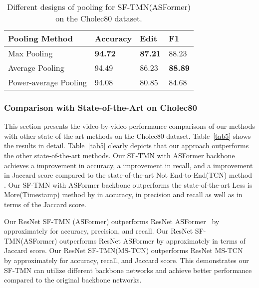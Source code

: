 \documentclass[sn-mathphys,Numbered]{sn-jnl}
\theoremstyle{thmstyleone}\newtheorem{theorem}{Theorem}\newtheorem{proposition}[theorem]{Proposition}
\theoremstyle{thmstyletwo}\newtheorem{example}{Example}\newtheorem{remark}{Remark}
\theoremstyle{thmstylethree}\newtheorem{definition}{Definition}
\begin{document}
\begin{table}[h]
\centering
\caption{Different designs of pooling for SF-TMN(ASFormer) on the Cholec80 dataset.}\label{tab3r}
\begin{tabular}{llll}
\hline
Pooling Method & Accuracy & Edit & F1\\
\hline
Max Pooling &  \textbf{94.72} & \textbf{87.21} &  88.23 \\
Average Pooling &  94.49 & 86.23 &  \textbf{88.89} \\
Power-average Pooling &  94.08 &  80.85 & 84.68 \\

\hline
\end{tabular}
\end{table}


\subsubsection{Comparison with State-of-the-Art on Cholec80}
This section presents the video-by-video performance comparisons of our methods with other state-of-the-art methods on the Cholec80 dataset. Table~\ref{tab5} shows the results in detail. Table~\ref{tab5} clearly depicts that our approach outperforms the other state-of-the-art methods. Our SF-TMN with ASFormer backbone achieves a  improvement in accuracy, a  improvement in recall, and a  improvement in Jaccard score compared to the state-of-the-art Not End-to-End(TCN) method \cite{yi2022not}. Our SF-TMN with ASFormer backbone outperforms the state-of-the-art Less is More(Timestamp) \cite{wang2022less} method by  in accuracy,  in precision and recall as well as  in terms of the Jaccard score.

Our ResNet SF-TMN (ASFormer) outperforms ResNet ASFormer~\cite{yi2021asformer,zhang2022surgicala} by approximately  for accuracy, precision, and recall. Our ResNet SF-TMN(ASFormer) outperforms ResNet ASFormer by approximately  in terms of Jaccard score. Our ResNet SF-TMN(MS-TCN) outperforms ResNet MS-TCN~\cite{farha2019ms} by approximately  for accuracy, recall, and Jaccard score. This demonstrates our SF-TMN can utilize different backbone networks and achieve better performance compared to the original backbone networks.
\end{document}
